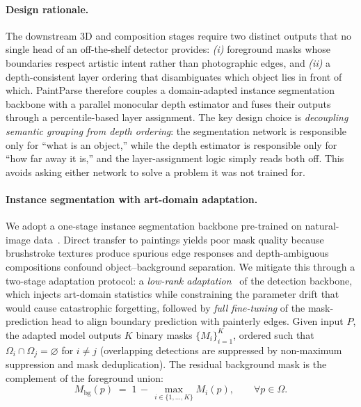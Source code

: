 \paragraph{Design rationale.}
The downstream 3D and composition stages require two distinct outputs
that no single head of an off-the-shelf detector provides:
\emph{(i)} foreground masks whose boundaries respect artistic intent
rather than photographic edges, and \emph{(ii)} a depth-consistent
layer ordering that disambiguates which object lies in front of which.
PaintParse therefore couples a domain-adapted instance segmentation
backbone with a parallel monocular depth estimator and fuses their
outputs through a percentile-based layer assignment. The key design
choice is \emph{decoupling semantic grouping from depth ordering}: the
segmentation network is responsible only for ``what is an object,''
while the depth estimator is responsible only for ``how far away it
is,'' and the layer-assignment logic simply reads both off. This
avoids asking either network to solve a problem it was not trained
for.

\paragraph{Instance segmentation with art-domain adaptation.}
We adopt a one-stage instance segmentation backbone pre-trained on
natural-image data~\cite{jocher2023yolov8}. Direct transfer to
paintings yields poor mask quality because brushstroke textures
produce spurious edge responses and depth-ambiguous compositions
confound object--background separation. We mitigate this through a
two-stage adaptation protocol: a \emph{low-rank
adaptation}~\cite{hu2022lora} of the detection backbone, which injects
art-domain statistics while constraining the parameter drift that would
cause catastrophic forgetting, followed by \emph{full fine-tuning} of
the mask-prediction head to align boundary prediction with painterly
edges. Given input $P$, the adapted model outputs $K$ binary masks
$\{M_i\}_{i=1}^{K}$, ordered such that
$\Omega_i \cap \Omega_j = \varnothing$ for $i \neq j$ (overlapping
detections are suppressed by non-maximum suppression and mask
deduplication). The residual background mask is the complement of the
foreground union:
\begin{equation}
    M_{\mathrm{bg}}(p) \;=\; 1 \,-\, \max_{i\in\{1,\dots,K\}} M_i(p),
    \qquad \forall p \in \Omega.
    \label{eq:bg_mask}
\end{equation}

